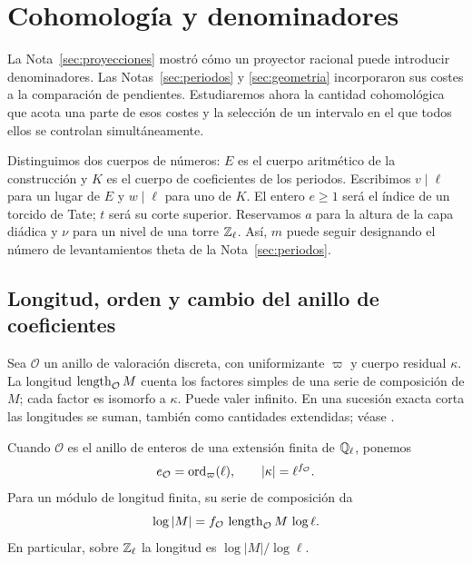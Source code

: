 \section{Cohomología y denominadores}
\label{sec:cohomologia}


La Nota~\ref{sec:proyecciones} mostró cómo un proyector racional
puede introducir denominadores. Las Notas~\ref{sec:periodos}
y \ref{sec:geometria} incorporaron sus costes a la comparación
de pendientes. Estudiaremos ahora la cantidad cohomológica
que acota una parte de esos costes y la selección de un
intervalo en el que todos ellos se controlan simultáneamente.

Distinguimos dos cuerpos de números: $E$ es el cuerpo
aritmético de la construcción y $K$ es el cuerpo de
coeficientes de los periodos. Escribimos $v\mid\ell$ para
un lugar de $E$ y $w\mid\ell$ para uno de $K$.
El entero $e\ge1$ será el índice de un torcido de Tate;
$t$ será su corte superior. Reservamos $a$ para la altura
de la capa diádica y $\nu$ para un nivel de una torre
$\mathbb{Z}_\ell$. Así, $m$ puede seguir designando el número de
levantamientos theta de la Nota~\ref{sec:periodos}.

\subsection{Longitud, orden y cambio del anillo de coeficientes}

Sea $\mathcal O$ un anillo de valoración discreta, con
uniformizante $\varpi$ y cuerpo residual $\kappa$.
La longitud $\operatorname{length}_{\mathcal O}M$ cuenta los factores
simples de una serie de composición de $M$; cada factor
es isomorfo a $\kappa$. Puede valer infinito.
En una sucesión exacta corta las longitudes se suman,
también como cantidades extendidas; véase \cite{stacks-longitud}.

Cuando $\mathcal O$ es el anillo de enteros de una extensión
finita de $\mathbb{Q}_\ell$, ponemos
\[
 e_{\mathcal O}=\operatorname{ord}_{\varpi}(\ell),\qquad
 |\kappa|=\ell^{f_{\mathcal O}}.
\]
Para un módulo de longitud finita, su serie de composición da
\begin{equation}
 \log|M|=f_{\mathcal O}\,\operatorname{length}_{\mathcal O}M\,\log\ell.
 \label{eq:cohom-longitud-orden}
\end{equation}
En particular, sobre $\mathbb{Z}_\ell$ la longitud es
$\log|M|/\log\ell$.

